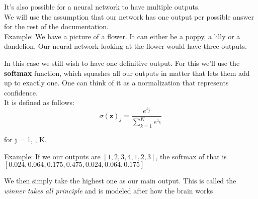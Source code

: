 It's also possible for a neural network to have multiple outputs.\\
We will use the assumption that our network has one output per possible answer for the rest of the documentation.\\
Example: We have a picture of a flower. It can either be a poppy, a lilly or a dandelion. Our neural network looking at the flower would have three outputs.

In this case we still wish to have one definitive output.
For this we'll use the \textbf{softmax} function, which squashes all our outputs in matter that lets them add up to exactly one. One can think of it as a normalization that represents confidence.\cite{Anderson1995}\\
It is defined as follows: 
$$\sigma(\mathbf{z})_j = \frac{e^{z_j}}{\sum_{k=1}^K e^{z_k}}$$ 

for j = 1, \textellipsis{}, K.

Example: If we our outputs are $[1,2,3,4,1,2,3]$, the softmax of that is $[0.024, 0.064, 0.175, 0.475, 0.024, 0.064, 0.175]$

We then simply take the highest one as our main output. This is called the \emph{winner takes all principle} and is modeled after how the brain works \cite{Anderson1995}\\

